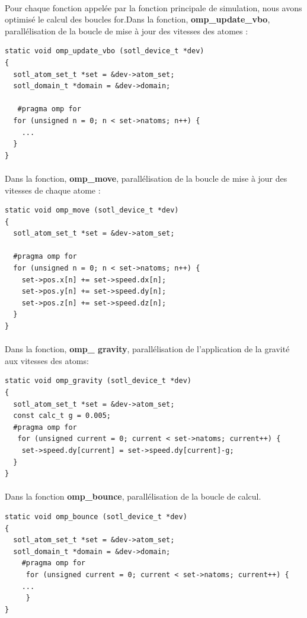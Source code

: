 \documentclass[a4paper,11pt]{report}
\begin{document}
\paragraph{}
Pour chaque fonction appelée par la fonction principale de simulation, nous avons optimisé le calcul des boucles for.Dans la fonction, \textbf{omp\_update\_vbo}, parallélisation de la boucle de mise à jour des vitesses des atomes :
\newline
\begin{lstlisting}[style=CStyle]
static void omp_update_vbo (sotl_device_t *dev)
{
  sotl_atom_set_t *set = &dev->atom_set;
  sotl_domain_t *domain = &dev->domain;

   #pragma omp for
  for (unsigned n = 0; n < set->natoms; n++) {
    ...
  }
}
\end{lstlisting}

\paragraph{}
Dans la fonction, \textbf{omp\_move}, parallélisation de la boucle de mise à jour des vitesses de chaque atome :
\newline
\begin{lstlisting}[style=CStyle]
static void omp_move (sotl_device_t *dev)
{
  sotl_atom_set_t *set = &dev->atom_set;

  #pragma omp for
  for (unsigned n = 0; n < set->natoms; n++) {
    set->pos.x[n] += set->speed.dx[n];
    set->pos.y[n] += set->speed.dy[n];
    set->pos.z[n] += set->speed.dz[n];
  }
}
\end{lstlisting}
\paragraph{}
Dans la fonction, \textbf{omp\_ gravity}, parallélisation de l'application de la gravité aux vitesses des atoms:
\newline
\begin{lstlisting}[style=CStyle]
static void omp_gravity (sotl_device_t *dev)
{
  sotl_atom_set_t *set = &dev->atom_set;
  const calc_t g = 0.005;
  #pragma omp for
   for (unsigned current = 0; current < set->natoms; current++) {
	set->speed.dy[current] = set->speed.dy[current]-g;
  }
}
\end{lstlisting}

\paragraph{}
Dans la fonction \textbf{omp\_bounce}, parallélisation de la boucle de calcul.
\newline
\begin{lstlisting}[style=CStyle]
static void omp_bounce (sotl_device_t *dev)
{
  sotl_atom_set_t *set = &dev->atom_set;
  sotl_domain_t *domain = &dev->domain;
    #pragma omp for
     for (unsigned current = 0; current < set->natoms; current++) {
	...
     }
}
\end{lstlisting}
\end{document}
